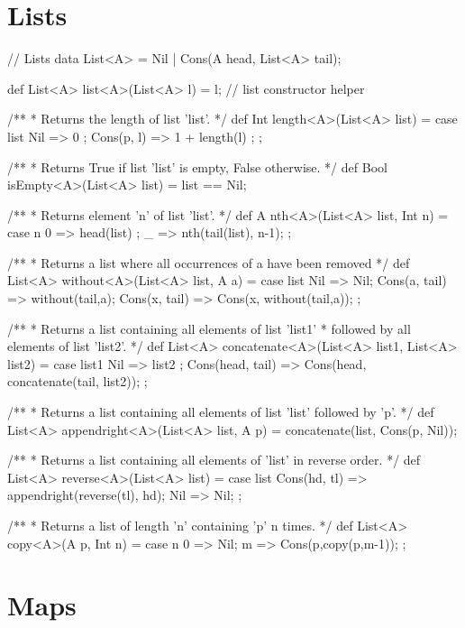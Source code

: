 \section{Lists}

\begin{abscode}
// Lists
data List<A> = Nil | Cons(A head, List<A> tail);

def List<A> list<A>(List<A> l) = l; // list constructor helper

/**
 * Returns the length of list 'list'.
 */
def Int length<A>(List<A> list) = 
   case list { 
      Nil => 0 ; 
      Cons(p, l) => 1 + length(l) ; 
   };

/**
 * Returns True if list 'list' is empty, False otherwise.
 */
def Bool isEmpty<A>(List<A> list) = list == Nil;

/**
 * Returns element 'n' of list 'list'.
 */
def A nth<A>(List<A> list, Int n) = 
  case n { 
    0 => head(list) ; 
    _ => nth(tail(list), n-1); 
  };
  
/**
 * Returns a list where all occurrences of a have been removed
 */
def List<A> without<A>(List<A> list, A a) =
  case list {
     Nil => Nil;
     Cons(a, tail) => without(tail,a);
     Cons(x, tail) => Cons(x, without(tail,a));
  };  
  
/**
 * Returns a list containing all elements of list 'list1'
 * followed by all elements of list 'list2'.
 */
def List<A> concatenate<A>(List<A> list1, List<A> list2) =
  case list1 { 
    Nil => list2 ; 
    Cons(head, tail) =>  Cons(head, concatenate(tail, list2)); 
  };
  
/**
 * Returns a list containing all elements of list 'list' followed by 'p'.
 */
def List<A> appendright<A>(List<A> list, A p) = 
    concatenate(list, Cons(p, Nil));

/**
 * Returns a list containing all elements of 'list' in reverse order.
 */
def List<A> reverse<A>(List<A> list) =
  case list { 
     Cons(hd, tl) => appendright(reverse(tl), hd); 
     Nil => Nil; 
  };
  
/**
 * Returns a list of length 'n' containing 'p' n times.
 */
def List<A> copy<A>(A p, Int n) = 
   case n { 0 => Nil; m => Cons(p,copy(p,m-1)); };
\end{abscode}

\section{Maps}

